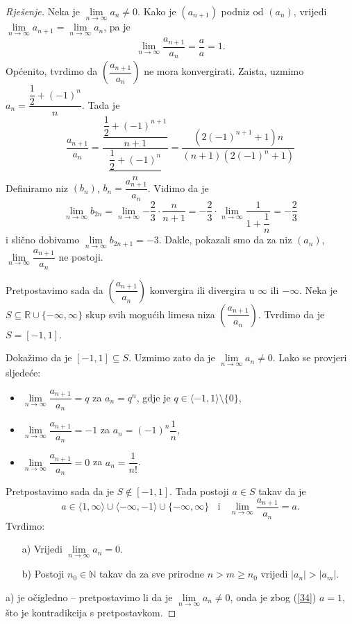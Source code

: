 \begin{proof}[Rješenje]
Neka je $\lim\limits_{n\to \infty}{a_n}\neq 0$. Kako je $(a_{n+1})$ podniz od $(a_n)$, vrijedi $\lim\limits_{n\to \infty}{a_{n+1}}=\lim\limits_{n\to \infty}{a_{n}}$, pa je
\begin{gather}
\label{34}
\lim\limits_{n\to \infty}{\dfrac{a_{n+1}}{a_n}}=\dfrac{a}{a}=1.
\end{gather}
Općenito, tvrdimo da $\left(\dfrac{a_{n+1}}{a_n}\right)$ ne mora konvergirati. Zaista, uzmimo $a_n=\dfrac{\dfrac{1}{2}+(-1)^n}{n}$. Tada je
$$\dfrac{a_{n+1}}{a_n}=\dfrac{\dfrac{\dfrac{1}{2}+(-1)^{n+1}}{n+1}}{\dfrac{\dfrac{1}{2}+(-1)^n}{n}}=\dfrac{\left(2\left(-1\right)^{n+1}+1\right)n}{\left(n+1\right)\left(2\left(-1\right)^n+1\right)}$$
Definiramo niz $(b_n)$, $b_n=\dfrac{a_{n+1}}{a_n}$. Vidimo da je $$\lim\limits_{n\to \infty}{b_{2n}}=\lim\limits_{n\to \infty}{-\dfrac{2}{3}\cdot \dfrac{n}{n+1}}=-\dfrac{2}{3}\cdot \lim\limits_{n\to \infty}{\dfrac{1}{1+\dfrac{1}{n}}}=-\dfrac{2}{3}$$
i slično dobivamo $\lim\limits_{n\to \infty}{b_{2n+1}}=-3$. Dakle, pokazali smo da za niz $(a_n)$, $\lim\limits_{n\to \infty}{\dfrac{a_{n+1}}{a_n}}$ ne postoji.

Pretpostavimo sada da $\left(\dfrac{a_{n+1}}{a_n}\right)$ konvergira ili divergira u $\infty$ ili $-\infty$. Neka je $S\subseteq \mathbb{R}\cup \{-\infty, \infty\}$ skup svih mogućih limesa niza $\left(\dfrac{a_{n+1}}{a_n}\right)$. Tvrdimo da je $S=[-1, 1]$. 

Dokažimo da je $[-1, 1]\subseteq S$. Uzmimo zato da je $\lim\limits_{n\to \infty}{a_n}\neq 0$. Lako se provjeri sljedeće:
\begin{itemize}
\item $\lim\limits_{n\to \infty}{\dfrac{a_{n+1}}{a_n}}=q$ za $a_n=q^n$, gdje je $q\in \langle -1, 1\rangle\setminus\{0\}$,
\item $\lim\limits_{n\to \infty}{\dfrac{a_{n+1}}{a_n}}=-1$ za $a_n=(-1)^n\dfrac{1}{n}$,
\item $\lim\limits_{n\to \infty}{\dfrac{a_{n+1}}{a_n}}=0$ za $a_n=\dfrac{1}{n!}$.
\end{itemize}

Pretpostavimo sada da je $S\notin [-1, 1]$. Tada postoji  $a\in S$ takav da je $$a\in \langle 1, \infty\rangle\cup \langle -\infty, -1\rangle\cup \{-\infty, \infty\}\;\;\text{ i }\;\;\lim\limits_{n\to \infty}{\dfrac{a_{n+1}}{a_n}}=a.$$ Tvrdimo:
\begin{itemize}
\item[a)] Vrijedi $\lim\limits_{n\to \infty}{a_n}=0$.
\item[b)] Postoji $n_0\in \mathbb{N}$ takav da za sve prirodne $n>m\geq n_0$ vrijedi $|a_{n}|>|a_m|$.
\end{itemize}
a) je očigledno -- pretpostavimo li da je $\lim\limits_{n\to \infty}{a_n}\neq 0$, onda je zbog (\ref{34}) $a=1$, što je kontradikcija s pretpostavkom.
 

\end{proof}
